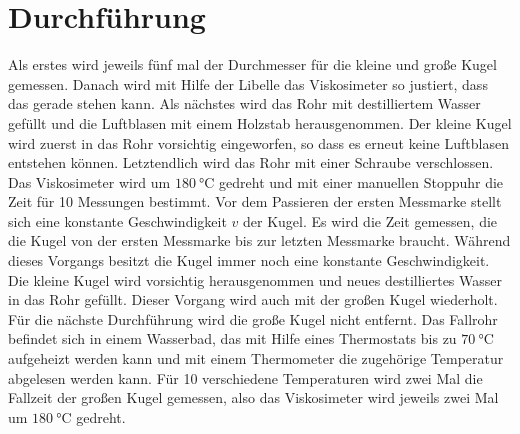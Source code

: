 \section{Durchführung}
\label{sec:Durchführung}
Als erstes wird jeweils fünf mal der Durchmesser für die kleine und große Kugel gemessen. Danach wird mit Hilfe der Libelle das Viskosimeter so justiert, dass das gerade stehen kann. 
Als nächstes wird das Rohr mit destilliertem Wasser gefüllt und die Luftblasen mit einem Holzstab herausgenommen. Der kleine Kugel wird zuerst in das Rohr vorsichtig eingeworfen, so dass es erneut 
keine Luftblasen entstehen können. Letztendlich wird das Rohr mit einer Schraube verschlossen. Das Viskosimeter wird um $\SI{180}{\degreeCelsius}$ gedreht und mit einer manuellen Stoppuhr die Zeit für 10 Messungen bestimmt. 
Vor dem Passieren der ersten Messmarke stellt sich eine konstante Geschwindigkeit $v$ der Kugel. Es wird die Zeit gemessen, die die Kugel von der ersten Messmarke bis zur letzten Messmarke braucht. Während dieses Vorgangs 
besitzt die Kugel immer noch eine konstante Geschwindigkeit. Die kleine Kugel wird vorsichtig herausgenommen und neues destilliertes Wasser in das Rohr gefüllt. Dieser Vorgang wird auch mit der großen Kugel wiederholt. 
Für die nächste Durchführung wird die große Kugel nicht entfernt. Das Fallrohr befindet sich in einem Wasserbad, das mit Hilfe eines Thermostats bis zu $\SI{70}{\degreeCelsius}$ aufgeheizt werden kann und mit einem 
Thermometer die zugehörige Temperatur abgelesen werden kann. Für 10 verschiedene Temperaturen wird zwei Mal die Fallzeit der großen Kugel gemessen, also das Viskosimeter wird jeweils zwei Mal um $\SI{180}{\degreeCelsius}$ gedreht.
 